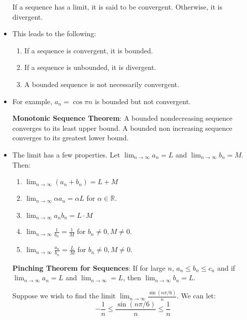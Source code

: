 \begin{itemize}
\begin{theorem}
    \end{theorem}
    \begin{definition}
        If a sequence has a limit, it is said to be convergent. Otherwise, it is divergent.
    \end{definition}
    \item This leads to the following:
    \begin{enumerate}
        \item If a sequence is convergent, it is bounded.
        \item If a sequence is unbounded, it is divergent.
        \item A bounded sequence is not necessarily convergent.
    \end{enumerate}
    \item For example, $a_n = \cos \pi n$ is bounded but not convergent.
    \begin{theorem}
        \textbf{Monotonic Sequence Theorem}: A bounded nondecreasing sequence converges to its least upper bound. A bounded non increasing sequence converges to its greatest lower bound.
    \end{theorem}
    \item The limit has a few properties. Let $\lim_{n\to\infty} a_n = L$ and $\lim_{n\to\infty}b_n = M$. Then:
    \begin{enumerate}
        \item $\lim_{n\to\infty}(a_n+b_n) = L+M$
        \item $\lim_{n\to\infty} \alpha a_n = \alpha L$ for $\alpha \in \mathbb{R}$.
        \item $\lim_{n\to\infty} a_nb_n = L \cdot M$
        \item $\lim_{n\to\infty} \frac{1}{b_n} = \frac{1}{M}$ for $b_n \neq 0, M \neq 0$.
        \item $\lim_{n\to\infty} \frac{a_n}{b_n} = \frac{L}{M}$ for $b_n \neq 0, M\neq 0$.
    \end{enumerate}
    \begin{theorem}
        \textbf{Pinching Theorem for Sequences}: If for large $n$, $a_n \le b_n \le c_n$ and if $\lim_{n\to\infty}a_n = L$ and $\lim_{n\to\infty} = L$, then $\lim_{n\to\infty}b_n = L$.
    \end{theorem}
    \begin{example}
        Suppose we wish to find the limit $\lim_{n\to\infty} \frac{\sin (n\pi/6)}{n}$. We can let:
        \begin{equation}
            -\frac{1}{n} \le \frac{\sin(n\pi/6)}{n} \le \frac{1}{n}

\end{equation}
\end{example}
\end{itemize}
